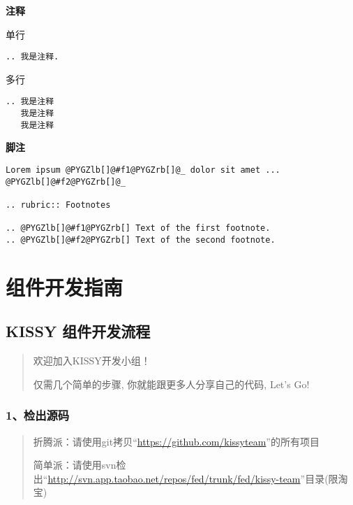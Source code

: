 \documentclass[letterpaper,10pt,english]{sphinxmanual}
\begin{document}
\textbf{注释}

单行

\begin{Verbatim}[commandchars=@\[\]]
.. 我是注释.
\end{Verbatim}

多行

\begin{Verbatim}[commandchars=@\[\]]
.. 我是注释
   我是注释
   我是注释
\end{Verbatim}

\textbf{脚注}

\begin{Verbatim}[commandchars=@\[\]]
Lorem ipsum @PYGZlb[]@#f1@PYGZrb[]@_ dolor sit amet ... @PYGZlb[]@#f2@PYGZrb[]@_

.. rubric:: Footnotes

.. @PYGZlb[]@#f1@PYGZrb[] Text of the first footnote.
.. @PYGZlb[]@#f2@PYGZrb[] Text of the second footnote.
\end{Verbatim}


\chapter{组件开发指南}
\label{workflow/index:id1}\label{workflow/index::doc}\label{workflow/index:workflow}

\section{KISSY 组件开发流程}
\label{workflow/workflow-simple:workflow-simple}\label{workflow/workflow-simple:kissy}\label{workflow/workflow-simple::doc}\begin{quote}

\begin{DUlineblock}{0em}
\item[] 欢迎加入KISSY开发小组！
\item[] 仅需几个简单的步骤, 你就能跟更多人分享自己的代码, Let's Go!
\end{DUlineblock}
\end{quote}


\subsection{1、检出源码}
\label{workflow/workflow-simple:id1}\begin{quote}

\begin{DUlineblock}{0em}
\item[] 折腾派：请使用git拷贝“\href{https://github.com/kissyteam}{https://github.com/kissyteam}”的所有项目
\item[] 简单派：请使用svn检出“\href{http://svn.app.taobao.net/repos/fed/trunk/fed/kissy-team}{http://svn.app.taobao.net/repos/fed/trunk/fed/kissy-team}”目录(限淘宝)
\end{DUlineblock}
\end{quote}
\end{document}
